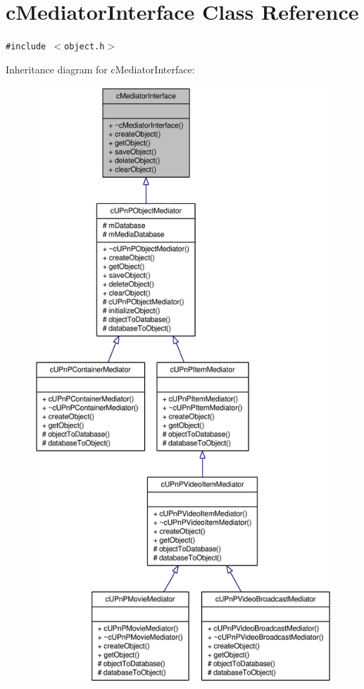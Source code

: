 \hypertarget{classcMediatorInterface}{
\section{cMediatorInterface Class Reference}
\label{classcMediatorInterface}
}
{\tt \#include $<$object.h$>$}

Inheritance diagram for cMediatorInterface:\nopagebreak
\begin{figure}[H]
\begin{center}
\leavevmode
\includegraphics[width=400pt]{classcMediatorInterface__inherit__graph}
\end{center}
\end{figure}
